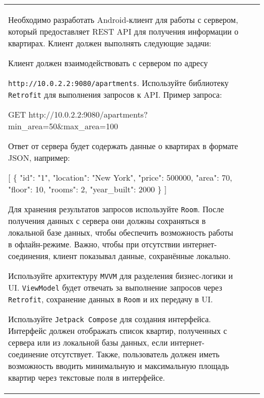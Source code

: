 \documentclass[a4paper]{article}
\begin{document}
\begin{tabular}{!{\vrule width 2pt}p{5cm}|p{6cm}|p{4cm}!{\vrule width 2pt}}
{\begin{minipage}{16cm}
\begin{enumerate}
Необходимо разработать Android-клиент для работы с сервером, который предоставляет REST API для получения информации о квартирах. Клиент должен выполнять следующие задачи:

Клиент должен взаимодействовать с сервером по адресу 

\texttt{http://10.0.2.2:9080/apartments}. Используйте библиотеку \texttt{Retrofit} для выполнения запросов к API. Пример запроса:


GET http://10.0.2.2:9080/apartments?min\_area=50\&max\_area=100


Ответ от сервера будет содержать данные о квартирах в формате JSON, например:


[
  \{
    "id": "1",
    "location": "New York",
    "price": 500000,
    "area": 70,
    "floor": 10,
    "rooms": 2,
    "year\_built": 2000
  \}
]


Для хранения результатов запросов используйте \texttt{Room}. После получения данных с сервера они должны сохраняться в локальной базе данных, чтобы обеспечить возможность работы в офлайн-режиме. Важно, чтобы при отсутствии интернет-соединения, клиент показывал данные, сохранённые локально.

Используйте архитектуру \texttt{MVVM} для разделения бизнес-логики и UI. \texttt{ViewModel} будет отвечать за выполнение запросов через \texttt{Retrofit}, сохранение данных в \texttt{Room} и их передачу в UI.

Используйте \texttt{Jetpack Compose} для создания интерфейса. Интерфейс должен отображать список квартир, полученных с сервера или из локальной базы данных, если интернет-соединение отсутствует. Также, пользователь должен иметь возможность вводить минимальную и максимальную площадь квартир через текстовые поля в интерфейсе.


\end{enumerate}
\end{minipage}}
\end{tabular}
\end{document}
